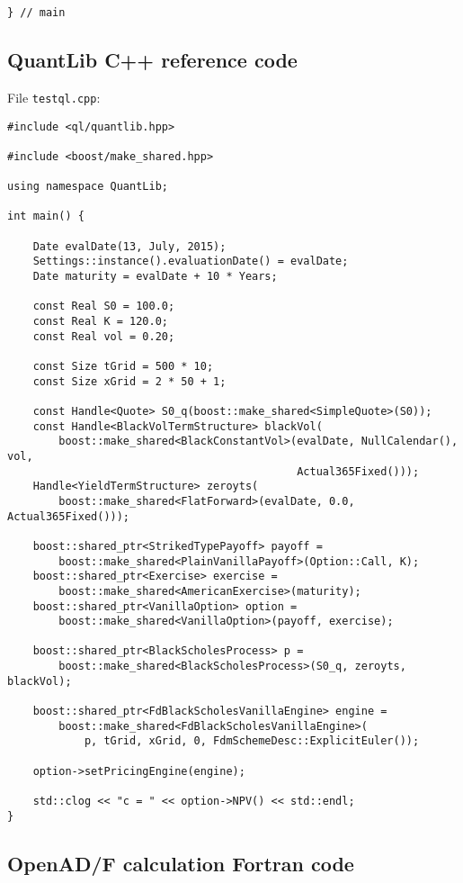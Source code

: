 \documentclass{amsart}
\theoremstyle{plain}
\numberwithin{equation}{section}
\begin{document}
\begin{appendix}
\begin{verbatim}
} // main
\end{verbatim}

\subsection{QuantLib C++ reference code}

File \verb+testql.cpp+:

\begin{verbatim}
#include <ql/quantlib.hpp>

#include <boost/make_shared.hpp>

using namespace QuantLib;

int main() {

    Date evalDate(13, July, 2015);
    Settings::instance().evaluationDate() = evalDate;
    Date maturity = evalDate + 10 * Years;

    const Real S0 = 100.0;
    const Real K = 120.0;
    const Real vol = 0.20;

    const Size tGrid = 500 * 10;
    const Size xGrid = 2 * 50 + 1;

    const Handle<Quote> S0_q(boost::make_shared<SimpleQuote>(S0));
    const Handle<BlackVolTermStructure> blackVol(
        boost::make_shared<BlackConstantVol>(evalDate, NullCalendar(), vol,
                                             Actual365Fixed()));
    Handle<YieldTermStructure> zeroyts(
        boost::make_shared<FlatForward>(evalDate, 0.0, Actual365Fixed()));

    boost::shared_ptr<StrikedTypePayoff> payoff =
        boost::make_shared<PlainVanillaPayoff>(Option::Call, K);
    boost::shared_ptr<Exercise> exercise =
        boost::make_shared<AmericanExercise>(maturity);
    boost::shared_ptr<VanillaOption> option =
        boost::make_shared<VanillaOption>(payoff, exercise);

    boost::shared_ptr<BlackScholesProcess> p =
        boost::make_shared<BlackScholesProcess>(S0_q, zeroyts, blackVol);

    boost::shared_ptr<FdBlackScholesVanillaEngine> engine =
        boost::make_shared<FdBlackScholesVanillaEngine>(
            p, tGrid, xGrid, 0, FdmSchemeDesc::ExplicitEuler());

    option->setPricingEngine(engine);

    std::clog << "c = " << option->NPV() << std::endl;
}
\end{verbatim}

\subsection{OpenAD/F calculation Fortran code}


\end{appendix}
\end{document}
